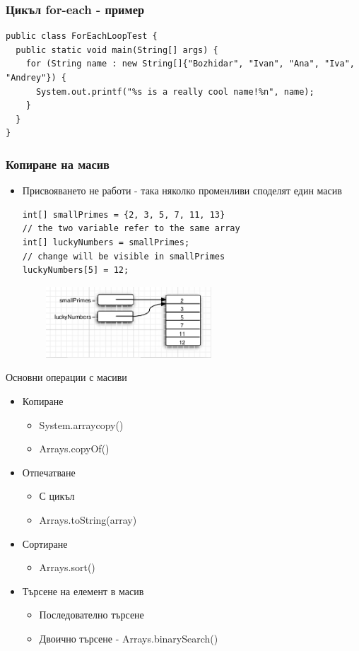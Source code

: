 \documentclass{beamer}
\begin{document}
\begin{frame}[fragile]
  \frametitle{Цикъл for-each - пример}
  \transdissolve
\begin{lstlisting}
public class ForEachLoopTest {
  public static void main(String[] args) {
    for (String name : new String[]{"Bozhidar", "Ivan", "Ana", "Iva", "Andrey"}) {
      System.out.printf("%s is a really cool name!%n", name);
    }
  }
}  
\end{lstlisting}
\end{frame}

\begin{frame}[fragile]
  \frametitle{Копиране на масив}
  \transdissolve
  \begin{itemize}
  \item Присвояването не работи - така няколко променливи споделят
    един масив \pause
    \begin{lstlisting}
int[] smallPrimes = {2, 3, 5, 7, 11, 13}
// the two variable refer to the same array
int[] luckyNumbers = smallPrimes;
// change will be visible in smallPrimes
luckyNumbers[5] = 12;
    \end{lstlisting}
    \pause
    \includegraphics[width=300px,height=100px]{images/arraycopy.png}
  \end{itemize}
\end{frame}

\begin{frame}{Основни операции с масиви}
  \transdissolve
  \begin{itemize}
  \item Копиране
    \begin{itemize}
    \item System.arraycopy()
    \item Arrays.copyOf()        
    \end{itemize}
    \pause
    \item Отпечатване
      \begin{itemize}
        \item С цикъл
        \item Arrays.toString(array)
      \end{itemize}
      \pause
    \item Сортиране
      \begin{itemize}
        \item Arrays.sort()
      \end{itemize}
    \pause
    \item Търсене на елемент в масив
      \begin{itemize}
        \item Последователно търсене
        \item Двоично търсене - Arrays.binarySearch()
      \end{itemize}
  \end{itemize}
\end{frame}
\end{document}
